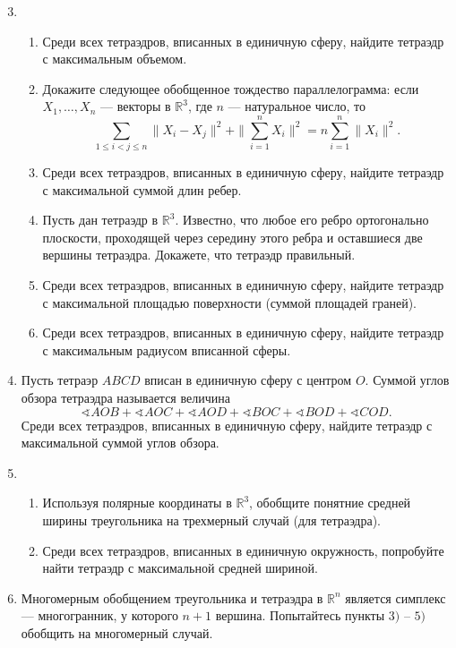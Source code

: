 \begin{enumerate} \setcounter{enumi}{2}
\item
\begin{enumerate}
\item Среди всех тетраэдров, вписанных в единичную сферу, найдите тетраэдр с максимальным объемом.
\item Докажите следующее обобщенное тождество параллелограмма: если $X_1,\dots, X_n$ --- векторы в $\mathbb R^3$, где $n$ --- натуральное число, то
$$
\sum_{1\leq i<j\leq n}\|X_i-X_j\|^2+\|\sum_{i=1}^n X_i\|^2=n\sum_{i=1}^n\| X_i\|^2.
$$
\item Среди всех тетраэдров, вписанных в единичную сферу, найдите тетраэдр с максимальной суммой длин ребер.
\item Пусть дан тетраэдр в $\mathbb R^3$. Известно, что любое его ребро ортогонально плоскости, проходящей через середину этого ребра и оставшиеся две вершины тетраэдра. Докажете, что тетраэдр правильный.
\item Среди всех тетраэдров, вписанных в единичную сферу, найдите тетраэдр  с максимальной площадью поверхности (суммой площадей граней).
\item Среди всех тетраэдров, вписанных в единичную сферу, найдите тетраэдр  с максимальным радиусом вписанной сферы.
\end{enumerate}
\item Пусть тетраэр $ABCD$ вписан в единичную сферу с центром $O$. Суммой углов обзора тетраэдра называется величина
\[
\sphericalangle AOB+\sphericalangle AOC+\sphericalangle AOD+\sphericalangle BOC+\sphericalangle BOD+\sphericalangle COD.
\]
Среди всех тетраэдров, вписанных в единичную сферу, найдите тетраэдр с максимальной суммой углов обзора.
\item
\begin{enumerate}
\item Используя полярные координаты в $\mathbb R^3$, обобщите понятние средней ширины треугольника на трехмерный случай (для тетраэдра).
\item Среди всех тетраэдров, вписанных в единичную окружность, попробуйте найти тетраэдр  с максимальной средней шириной.
\end{enumerate}
\item Многомерным обобщением треугольника и тетраэдра в $\mathbb R^n$ является симплекс --- многогранник, у которого $n+1$ вершина. Попытайтесь пункты $3)$ -- $5)$ обобщить на многомерный случай.
\end{enumerate}

